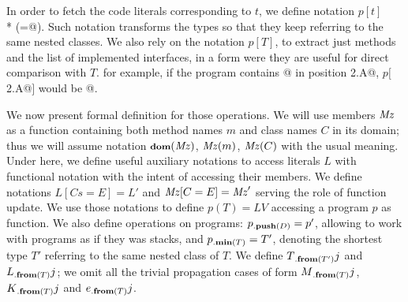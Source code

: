 In order to fetch the code literals corresponding to $t$,
we define notation $p[t]$\\*
(=@).
Such notation transforms the types so that they keep referring to the same nested classes.
We also rely on the notation $p[T]$, to extract just methods and the list of implemented interfaces, in a form were they are useful for direct comparison with 
$T$.
for example, if the program contains @
in position 
\Q@This2.A@, $p[$\Q@This2.A@$]$ would be 
@.



We now present formal definition for those operations.
We will use members $\mathit{Mz}$ as a function containing both method names $m$
and class names $C$ in its domain; thus we will assume
notation ${\footnotesize{\textbf{dom}}({\mathit{Mz}})}$, $\mathit{Mz}(m)$, $\mathit{Mz}(C)$ with the usual meaning.
Under here, we define useful auxiliary notations to
access literals $L$ with functional notation with the intent of accessing their members. We define notations $L[Cs=E]=L'$ and $\mathit{Mz}[C=E]=\mathit{Mz}'$ serving the role of function update.
We use those notations to define $p(T)=LV$ accessing a program $p$ as function. We also define operations on programs: $p{{}_{.\textbf{push}({D})}}=p'$, allowing to work with programs as if they was stacks, and
$p{{}_{.\textbf{min}({T})}}=T'$, denoting the shortest type $T'$ referring to the same 
nested class of $T$.
We define $T{{}_{.\textbf{from}({T'})}}{j}$ and $L{{}_{.\textbf{from}({T})}}{j}$; we omit all the trivial propagation cases of form $M{{}_{.\textbf{from}({T})}}{j}$, $K{{}_{.\textbf{from}({T})}}{j}$ and $e{{}_{.\textbf{from}({T})}}{j}$.


